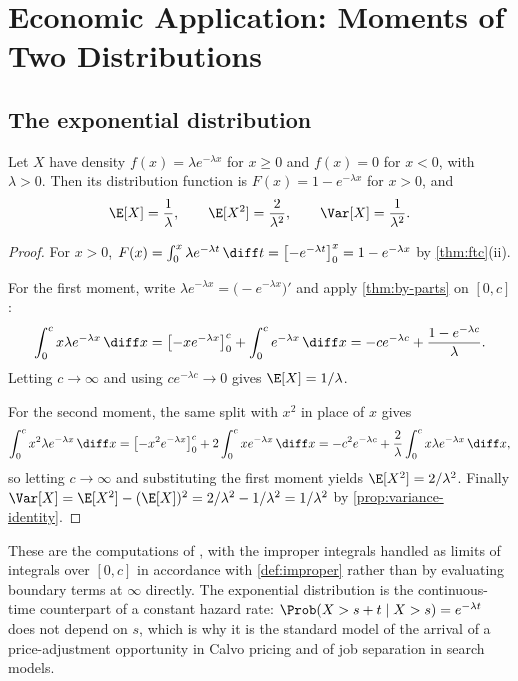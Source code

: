 \section{Economic Application: Moments of Two Distributions}\label{sec:int-moments}

\subsection{The exponential distribution}\label{sec:int-exponential}

\begin{proposition}\label{prop:exponential-moments}
	Let $X$ have density $f(x)=\lambda e^{-\lambda x}$ for $x\geq0$ and $f(x)=0$ for
	$x<0$, with $\lambda>0$. Then its distribution function is
	$F(x)=1-e^{-\lambda x}$ for $x>0$, and
	\[
		\E[X]=\frac{1}{\lambda},\qquad \E[X^2]=\frac{2}{\lambda^2},
		\qquad \Var[X]=\frac{1}{\lambda^2} .
	\]
\end{proposition}

\begin{proof}
	For $x>0$, $F(x)=\int_0^x\lambda e^{-\lambda t}\,\diff t
		=\bigl[-e^{-\lambda t}\bigr]_0^x=1-e^{-\lambda x}$ by \autoref{thm:ftc}(ii).

	For the first moment, write $\lambda e^{-\lambda x}=\bigl(-e^{-\lambda
			x}\bigr)'$ and apply \autoref{thm:by-parts} on $[0,c]$:
	\[
		\int_0^{c}x\lambda e^{-\lambda x}\,\diff x
		=\bigl[-xe^{-\lambda x}\bigr]_0^{c}+\int_0^{c}e^{-\lambda x}\,\diff x
		=-ce^{-\lambda c}+\frac{1-e^{-\lambda c}}{\lambda} .
	\]
	Letting $c\to\infty$ and using $ce^{-\lambda c}\to0$ gives $\E[X]=1/\lambda$.

	For the second moment, the same split with $x^2$ in place of $x$ gives
	\[
		\int_0^{c}x^2\lambda e^{-\lambda x}\,\diff x
		=\bigl[-x^2e^{-\lambda x}\bigr]_0^{c}+2\int_0^{c}xe^{-\lambda x}\,\diff x
		=-c^2e^{-\lambda c}+\frac{2}{\lambda}\int_0^{c}x\lambda e^{-\lambda x}\,\diff x,
	\]
	so letting $c\to\infty$ and substituting the first moment yields
	$\E[X^2]=2/\lambda^2$. Finally
	$\Var[X]=\E[X^2]-(\E[X])^2=2/\lambda^2-1/\lambda^2=1/\lambda^2$ by
	\autoref{prop:variance-identity}.
\end{proof}

These are the computations of \autocite[slides 73--77]{fukuda2026calculus}, with
the improper integrals handled as limits of integrals over $[0,c]$ in accordance
with \autoref{def:improper} rather than by evaluating boundary terms at
$\infty$ directly. The exponential distribution is the continuous-time
counterpart of a constant hazard rate: $\Prob(X>s+t\mid X>s)=e^{-\lambda t}$ does
not depend on $s$, which is why it is the standard model of the arrival of a
price-adjustment opportunity in Calvo pricing and of job separation in search
models.

